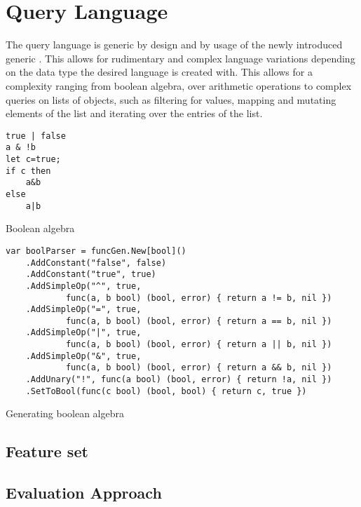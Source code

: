 \chapter{Query Language}

The query language is generic by design and by usage of the newly introduced
generic \cite{go_generic_proposal}. This allows for rudimentary and complex
language variations depending on the data type the desired language is created
with. This allows for a complexity ranging from boolean algebra, over
arithmetic operations to complex queries on lists of objects, such as filtering
for values, mapping and mutating elements of the list and iterating over the
entries of the list.

\begin{listing}[H]
    \begin{verbatim}
true | false
a & !b
let c=true;
if c then 
    a&b 
else 
    a|b
    \end{verbatim}
    \caption{Boolean algebra}
    \label{code:language-example-boolean}
\end{listing}

\begin{listing}[H]
    \begin{verbatim}
var boolParser = funcGen.New[bool]()
    .AddConstant("false", false)
    .AddConstant("true", true)
    .AddSimpleOp("^", true, 
            func(a, b bool) (bool, error) { return a != b, nil })
    .AddSimpleOp("=", true, 
            func(a, b bool) (bool, error) { return a == b, nil })
    .AddSimpleOp("|", true, 
            func(a, b bool) (bool, error) { return a || b, nil })
    .AddSimpleOp("&", true, 
            func(a, b bool) (bool, error) { return a && b, nil })
    .AddUnary("!", func(a bool) (bool, error) { return !a, nil })
    .SetToBool(func(c bool) (bool, bool) { return c, true })
    \end{verbatim}
    \caption{Generating boolean algebra}
    \label{code:language-example-boolean-gen}
\end{listing}

\section{Feature set}

\section{Evaluation Approach}

